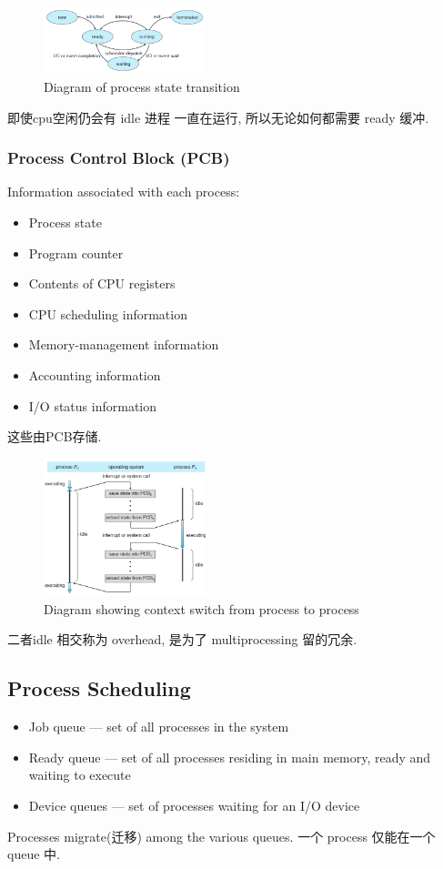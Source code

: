 \begin{figure}[!htb]
    \centering
    \includegraphics[width=0.42\textwidth]{pic/OS3/Diagram of process state.png}
    \caption{Diagram of process state transition}
\end{figure}
即使cpu空闲仍会有 idle 进程 一直在运行, 所以无论如何都需要 ready 缓冲. 

\subsubsection{Process Control Block (PCB)}
Information associated with each process: 
\begin{itemize}
    \item Process state
    \item Program counter
    \item Contents of CPU registers
    \item CPU scheduling information
    \item Memory-management information
    \item Accounting information
    \item I/O status information
\end{itemize}
这些由PCB存储.

\begin{figure}[!htb]
    \centering
    \includegraphics[width=0.42\textwidth]{pic/OS3/Diagram showing context switch from process to process}
    \caption{Diagram showing context switch from process to process}
\end{figure}
二者idle 相交称为 overhead, 是为了 multiprocessing 留的冗余. 

\subsection{Process Scheduling}
\begin{itemize}
    \item Job queue --- set of all processes in the system
    \item Ready queue --- set of all processes residing in main memory, ready and waiting to execute
    \item Device queues --- set of processes waiting for an I/O device
\end{itemize}
Processes migrate(迁移) among the various queues. 一个 process 仅能在一个 queue 中. 

